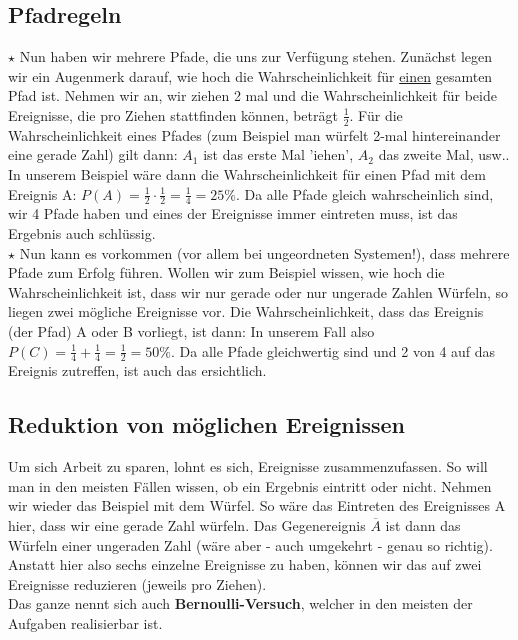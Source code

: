 	\subsection{Pfadregeln}
		\(\star\) Nun haben wir mehrere Pfade, die uns zur Verfügung stehen. Zunächst
		legen wir ein Augenmerk darauf, wie hoch die Wahrscheinlichkeit für
		\underline{einen} gesamten Pfad ist. Nehmen wir an, wir ziehen 2 mal und die
		Wahrscheinlichkeit für beide Ereignisse, die pro Ziehen stattfinden können,
		beträgt \(\frac{1}{2}\). Für die Wahrscheinlichkeit eines Pfades (zum Beispiel
		man würfelt 2-mal hintereinander eine gerade Zahl) gilt dann:
		\formel{\[P(A)=P(A_1) \cdot P(A_2) \cdot \ldots\]}
		\(A_1\) ist das erste Mal 'iehen', \(A_2\) das zweite Mal, usw.. In unserem
		Beispiel wäre dann die Wahrscheinlichkeit für einen Pfad mit dem Ereignis A:
		\(P(A)=\frac{1}{2} \cdot \frac{1}{2}=\frac{1}{4}=25\%\). Da alle Pfade gleich
		wahrscheinlich sind, wir 4 Pfade haben und eines der Ereignisse immer
		eintreten muss, ist das Ergebnis auch schlüssig.\\
		\(\star\) Nun kann es vorkommen (vor allem bei ungeordneten Systemen!), dass
		mehrere Pfade zum Erfolg führen. Wollen wir zum Beispiel wissen, wie hoch die
		Wahrscheinlichkeit ist, dass wir nur gerade oder nur ungerade Zahlen Würfeln,
		so liegen zwei mögliche Ereignisse vor. Die Wahrscheinlichkeit, dass das
		Ereignis (der Pfad) A oder B vorliegt, ist dann:
		\formel{\[P(A\cup B)=P(A)+P(B)\]}
		In unserem Fall also \(P(C)=\frac{1}{4}+\frac{1}{4}=\frac{1}{2}=50\%\). Da
		alle Pfade gleichwertig sind und 2 von 4 auf das Ereignis zutreffen, ist auch
		das ersichtlich.
		

	\subsection{Reduktion von möglichen Ereignissen}
		Um sich Arbeit zu sparen, lohnt es sich, Ereignisse zusammenzufassen. So will
		man in den meisten Fällen wissen, ob ein Ergebnis eintritt oder nicht.
		Nehmen wir wieder das Beispiel mit dem Würfel. So wäre das Eintreten des
		Ereignisses A hier, dass wir eine gerade Zahl würfeln. Das Gegenereignis
		\(\overline{A}\) ist dann das Würfeln einer ungeraden Zahl (wäre aber - auch
		umgekehrt - genau so richtig). Anstatt hier also sechs einzelne Ereignisse zu
		haben, können wir das auf zwei Ereignisse reduzieren (jeweils pro Ziehen).\\
		Das ganze nennt sich auch \textbf{Bernoulli-Versuch}, welcher in den meisten
		der Aufgaben realisierbar ist.

